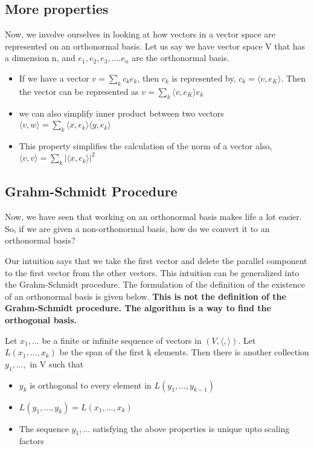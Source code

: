 \subsection{More properties}

Now, we involve ourselves in looking at how vectors in a vector space are represented on an orthonormal basis. Let us say we have vector space V that has a dimension n, and $e_1, e_2, e_3,.... e_n$ are the orthonormal basis. 

\begin{itemize}
    \item If we have a vector $v=\sum_k c_k e_k$, then $c_k$ is represented by, $c_k=\langle v, e_K \rangle$. Then the vector can be represented as $v=\sum_k \langle v, e_K \rangle e_k$
    \item we can also simplify inner product between two vectors $\langle v ,w \rangle = \sum_k \langle x,e_k\rangle \overline{\langle y, e_k \rangle}$
    \item This property simplifies the calculation of the norm of a vector also, $\langle v,v \rangle = \sum_{k} |\langle x,e_k\rangle|^2$
\end{itemize}


\subsection{Grahm-Schmidt Procedure}

Now, we have seen that working on an orthonormal basis makes life a lot easier. So, if we are given a non-orthonormal basis, how do we convert it to an orthonormal basis? 

Our intuition says that we take the first vector and delete the parallel component to the first vector from the other vectors. This intuition can be generalized into the Grahm-Schmidt procedure. The formulation of the definition of the existence of an orthonormal basis is given below. \textbf{This is not the definition of the Grahm-Schmidt procedure. The algorithm is a way to find the orthogonal basis.}

\begin{outline}
    Let $x_1, . . .$ be a finite or infinite sequence of vectors in
$(V,\langle,\rangle)$. Let $L(x_1, . . . , x_k )$ be the span of the first k elements.
Then there is another collection $y_1, . . . ,$ in V such that

\begin{itemize}
    \item $y_k$ is orthogonal to every element in $L(y_1, . . . , y_{k−1})$
    \item $L(y_1, . . . , y_k ) = L(x_1, . . . , x_k )$
    \item The sequence $y_1, . . .$ satisfying the above properties is unique upto scaling factors
\end{itemize}
\end{outline}

